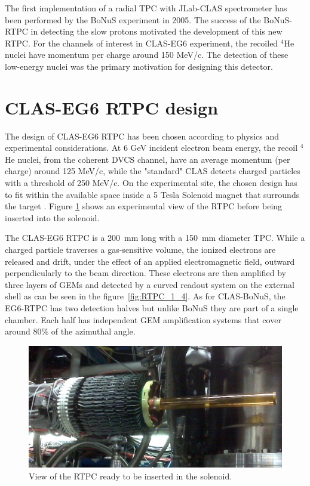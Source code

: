 \documentclass[twocolumn,showpacs,superscriptaddress,groupedaddress]{revtex4}
\begin{document}
The first implementation of a radial TPC with JLab-CLAS spectrometer has been 
performed by the BoNuS experiment \cite{BONUS} in 2005. The success of the 
BoNuS-RTPC in detecting the slow protons motivated the development of this new 
RTPC. For the channels of interest in CLAS-EG6 experiment, the recoiled 
$^{4}$He nuclei have momentum per charge around 150 MeV/c. The detection of 
these low-energy nuclei was the primary motivation for designing this detector. 

 
\section{CLAS-EG6 RTPC design} \label{sec_design}
The design of CLAS-EG6 RTPC has been chosen according to physics and 
experimental considerations. At 6 GeV incident electron beam energy, the recoil 
$^{4}$He nuclei, from the coherent DVCS channel, have an average momentum (per 
charge) around 125 MeV/c, while the "standard" CLAS detects charged particles 
with a threshold of 250 MeV/c. On the experimental site, the chosen design has 
to fit within the available space inside a 5 Tesla Solenoid magnet that 
surrounds the target \cite{Hyon-suk}. Figure \ref{fig:RTPC2} shows an 
experimental view of the RTPC before being inserted into the solenoid. 


The CLAS-EG6 RTPC is a 200~mm long with a 150~mm diameter TPC. While a charged 
particle traverses a gas-sensitive volume, the ionized electrons are released 
and drift, under the effect of an applied electromagnetic field, outward 
perpendicularly to the beam direction. These electrons are then amplified by 
three layers of GEMs and detected by a curved readout system on the external 
shell as can be seen in the figure~\ref{fig:RTPC_1_4}. As for CLAS-BoNuS, the 
EG6-RTPC has two detection halves but unlike BoNuS they are part of a single 
chamber. Each half has independent GEM amplification systems that cover around 
80\% of the azimuthal angle.

\begin{figure}[tb]
\centering
\includegraphics[scale=0.19]{fig/RTPC_exp.png}
\caption{View of the RTPC ready to be inserted in the solenoid. } 
\label{fig:RTPC2}
\end{figure}
\end{document}
